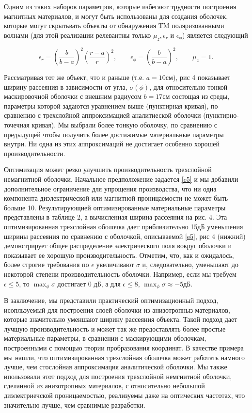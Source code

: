 \documentclass[a4paper, 12pt]{article}
\begin{document}
Одним из таких наборов параметров, которые избегают трудности построения
магнитных материалов, и могут быть использованы для создания оболочек,
которые могут скрытьвать объекты от обнаружения TM поляризованными волнами
(для этой реализации релевантны только $\mu_z, \epsilon_r$ и $\epsilon_\phi$)
является следующий

\begin{equation}\label{e5}
  \epsilon_r = \left( \frac{b}{b-a} \right)^2 \left( \frac{r-a}{r}\right)^2,
  \qquad
  \epsilon_\phi = \left( \frac{b}{b-a}\right)^2,
  \qquad
  \mu_z =1.
\end{equation}

Рассматривая тот же объект, что и раньше (т.е. $a=10$см), рис 4
показывает ширину рассеяния в зависимости от угла, $\sigma(\phi)$,
для относительно тонкой маскировочной оболочки с внешним радиусом $b=17$см
состощая из среды, параметры которой задаются уравнением выше (пунктирная кривая),
по сравнению с трехслойной аппроксимацией аналитиеской оболочки (пунктирно-точечная
кривая). Мы выбрали более тонкую оболочку, по сравнению с предыдущей
чтобы получить более достижимые материальные параметры внутри. Ни одна из
этих аппроксимаций не достигает особенно хорошей производительности.

Оптимизация может резко улучшить производительность трехслойной немагнитной
оболочки. Начальное предположение задается \eqref{e5} и мы добавили дополнительное ограничение для упрощения производства, что ни одна компонента диэлектрической
или магнитной проницаемости не может быть больше 10. Результирующией
оптимизированные материальные параметры представлены в таблице 2, а
вычисленная ширина рассеяния на рис. 4. Эта оптимизированная трехслойная оболочка
дает приблизительно 15дБ уменьшения ширины рассеяния по сравнению с оболочкой,
описываемой \eqref{e5}, рис 4 (нижний) демонстрирует общее распределение
электрического поля вокруг оболочки и показывает ее хорошую производительность.
Отметим, что, как и ожидалось, более строгие требования по $\epsilon$ увеличивают
 $\sigma$ и, следовательно, уменьшают до некоторой степени производительность оболочки. Например, если мы требуем $\epsilon \le 5$, то $\max_\phi \sigma$
достигает 0 дБ, а для $\epsilon \le 8$, $\max_\phi \sigma \approx -5$дБ.

В заключение, мы представили практический оптимизационный подход, исопльзуемый для
построения слоей оболочки из анизотропныз материалов, которые значительно
уменшают ширину рассеяния объекта. Такой подход дает лучшую производительность
и может так же предоставлять более простые материальные параметры, в сравнении
с маскирующими оболочкам, построенными с помощью теории пробразования
координат. В качестве примера мы нашли, что оптимизированная трехслойная оболочка
может работать намного лучше, чем стослойная аппроксимация аналитической оболочки.
Мы также ипользовали этот подход для построения трехслойной немгнитной оболочки,
сделанной из анизотропных материалов, с относительно небольшой диэлектриечской
проницаемостью, реализуемы даже на оптических частотах, что значительно лучше,
чем сравнимые разработки.
\end{document}
